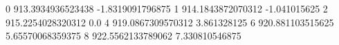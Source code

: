 0 913.3934936523438 -1.8319091796875
1 914.1843872070312 -1.041015625
2 915.2254028320312 0.0
4 919.0867309570312 3.861328125
6 920.881103515625 5.65570068359375
8 922.5562133789062 7.330810546875
